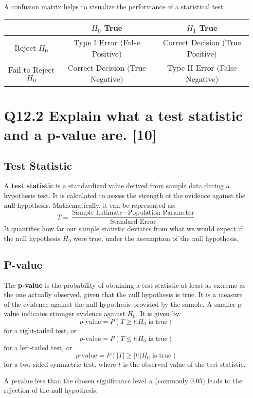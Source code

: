 \documentclass[11pt]{article}
\begin{document}
A confusion matrix helps to visualize the performance of a statistical test:

\begin{center}
\begin{tabular}{|c|c|c|}
\hline
 & $H_0$ True & $H_1$ True \\
\hline
Reject $H_0$ & Type I Error (False Positive) & Correct Decision (True Positive) \\
\hline
Fail to Reject $H_0$ & Correct Decision (True Negative) & Type II Error (False Negative) \\
\hline
\end{tabular}
\end{center}

\section{Q12.2 Explain what a test statistic and a p-value are. [10]}

\subsection*{Test Statistic}
A \textbf{test statistic} is a standardized value derived from sample data during a hypothesis test. It is calculated to assess the strength of the evidence against the null hypothesis. Mathematically, it can be represented as:
\[ T = \frac{\text{Sample Estimate} - \text{Population Parameter}}{\text{Standard Error}} \]
It quantifies how far our sample statistic deviates from what we would expect if the null hypothesis $H_0$ were true, under the assumption of the null hypothesis.

\subsection*{P-value}
The \textbf{p-value} is the probability of obtaining a test statistic at least as extreme as the one actually observed, given that the null hypothesis is true. It is a measure of the evidence against the null hypothesis provided by the sample. A smaller p-value indicates stronger evidence against $H_0$. It is given by:
\[ p\text{-value} = P(T \geq t | H_0 \text{ is true}) \]
for a right-tailed test, or 
\[ p\text{-value} = P(T \leq t | H_0 \text{ is true}) \]
for a left-tailed test, or
\[ p\text{-value} = P(|T| \geq |t| | H_0 \text{ is true}) \]
for a two-sided symmetric test.
where $t$ is the observed value of the test statistic.

A p-value less than the chosen significance level $\alpha$ (commonly 0.05) leads to the rejection of the null hypothesis.
\end{document}

